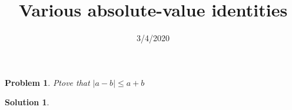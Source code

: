 \documentclass{article}
\title{Various absolute-value identities}
\date{3/4/2020}
\newtheorem*{problem*}{Problem}
\newtheorem*{solution*}{Solution}
\begin{document}
\maketitle
 
\begin{problem*}Ptove that $|a-b|\le{a+b}$
\end{problem*}
\begin{solution*}
\end{solution*}
\end{document}
